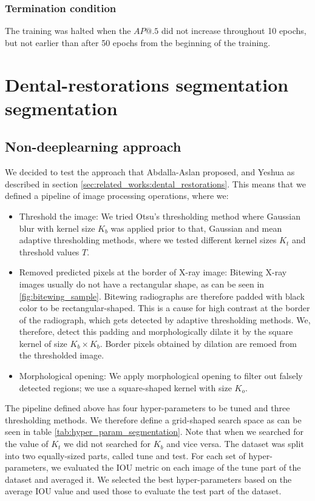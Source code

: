 \subsubsection{Termination condition}
The training was halted when the $AP@.5$ did not increase throughout 10 epochs, but not earlier than after 50 epochs from the beginning of the training.

\section{Dental-restorations segmentation segmentation}
\subsection{Non-deeplearning approach}
We decided to test the approach that Abdalla-Aslan proposed, and Yeshua \cite{AbdallaAslan2020, Yeshua2019} as described in section \ref{sec:related_works:dental_restorations}. This means that we defined a pipeline of image processing operations, where we:
\begin{itemize}
    \item Threshold the image: We tried Otsu's thresholding method where Gaussian blur with kernel size $K_b$ was applied prior to that, Gaussian and mean adaptive thresholding methods, where we tested different kernel sizes $K_t$ and threshold values $T$.
    \item Removed predicted pixels at the border of X-ray image: Bitewing X-ray images usually do not have a rectangular shape, as can be seen in \ref{fig:bitewing_sample}. Bitewing radiographs are therefore padded with black color to be rectangular-shaped. This is a cause for high contrast at the border of the radiograph, which gets detected by adaptive thresholding methods. We, therefore, detect this padding and morphologically dilate it by the square kernel of size $K_b \times K_b$. Border pixels obtained by dilation are remoed from the thresholded image.
    \item Morphological opening: We apply morphological opening to filter out falsely detected regions; we use a square-shaped kernel with size $K_o$.
\end{itemize}

The pipeline defined above has four hyper-parameters to be tuned and three thresholding methods. We therefore define a grid-shaped search space as can be seen in table \ref{tab:hyper_param_segmentation}. Note that when we searched for the value of $K_t$ we did not searched for $K_b$ and vice versa.
The dataset was split into two equally-sized parts, called tune and test. For each set of hyper-parameters, we evaluated the IOU metric on each image of the tune part of the dataset and averaged it. We selected the best hyper-parameters based on the average IOU value and used those to evaluate the test part of the dataset.

